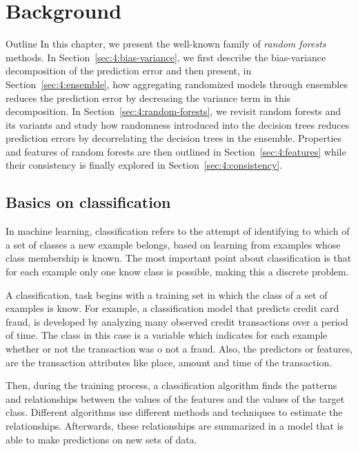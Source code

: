 \chapter{Background}

\begin{remark}{Outline}
In this chapter, we present the well-known family of \textit{random forests}
methods. In Section~\ref{sec:4:bias-variance}, we first describe the bias-variance
decomposition of the prediction error and then present, in
Section~\ref{sec:4:ensemble}, how aggregating randomized models through
ensembles reduces the prediction error by decreasing the variance term in this
decomposition. In Section~\ref{sec:4:random-forests}, we revisit random forests
and its variants and study how randomness introduced into the decision trees
reduces prediction errors by decorrelating the decision
trees in the ensemble. Properties and features of random forests are then outlined
in Section~\ref{sec:4:features} while their consistency
is finally explored in Section~\ref{sec:4:consistency}.
\end{remark}


\section{Basics on classification}
In machine learning, classification refers to the attempt of identifying to which of a set of 
classes a new example belongs, based on learning from examples whose class membership is known. 
The most important point about classification is that for each example only one know class is 
possible, making this a discrete problem. 

A classification, task begins with a training set in which the class of a set of examples is know. 
For example, a classification model that predicts credit card fraud, is developed by analyzing 
many observed credit transactions over a period of time. The class in this case is a variable which 
indicates for each example whether or not the transaction was o not a fraud. Also, the predictors 
or features, are the transaction attributes like place, amount and time of the transaction.

Then, during the training process, a classification algorithm finds the patterns and relationships 
between the values of the features and the values of the target class. Different algorithms use 
different methods and techniques to estimate the relationships. Afterwards, these relationships are 
summarized in a model that is able to make predictions on new sets of data.

